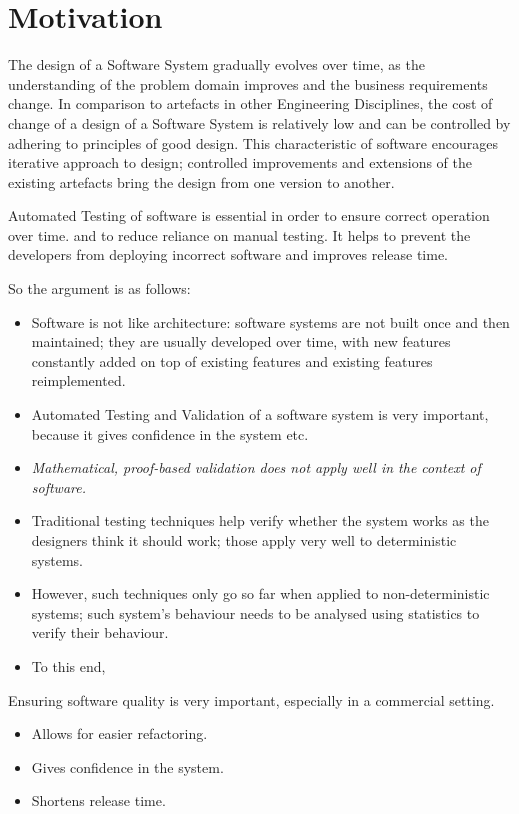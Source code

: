 \section{Motivation}

The design of a Software System gradually evolves over time, as the understanding of the problem domain improves and the business requirements change. In comparison to artefacts in other Engineering Disciplines, the cost of change of a design of a Software System is relatively low and can be controlled by adhering to principles of good design. This characteristic of software encourages iterative approach to design; controlled improvements and extensions of the existing artefacts bring the design from one version to another.

Automated Testing of software is essential in order to ensure correct operation over time. and to reduce reliance on manual testing. It helps to prevent the developers from deploying incorrect software and improves release time.

So the argument is as follows:
\begin{itemize}
\item Software is not like architecture: software systems are not built once and then maintained; they are usually developed over time, with new features constantly added on top of existing features and existing features reimplemented.
\item Automated Testing and Validation of a software system is very important, because it gives confidence in the system etc.
\item \textit{Mathematical, proof-based validation does not apply well in the context of software.} 
\item Traditional testing techniques help verify whether the system works as the designers think it should work; those apply very well to deterministic systems.
\item However, such techniques only go so far when applied to non-deterministic systems; such system's behaviour needs to be analysed using statistics to verify their behaviour.
\item To this end, 
\end{itemize}


Ensuring software quality is very important, especially in a commercial setting. 

\begin{itemize}
\item Allows for easier refactoring.
\item Gives confidence in the system.
\item Shortens release time. 
\end{itemize}
 

